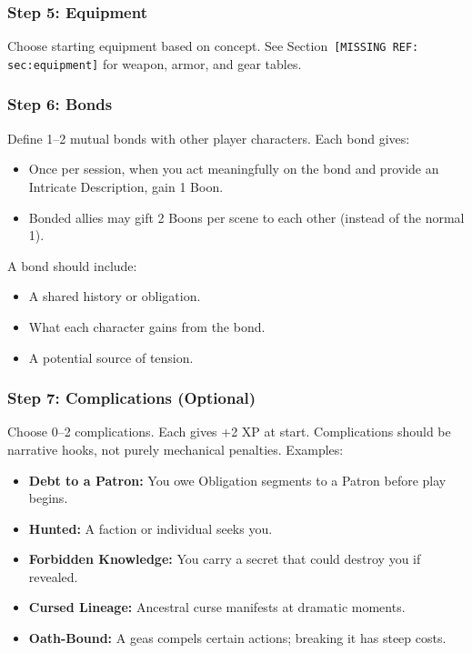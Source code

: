 \subsubsection{Step 5: Equipment}
Choose starting equipment based on concept. See Section~\texttt{[MISSING REF: sec:equipment]} for weapon, armor, and gear tables.

\subsubsection{Step 6: Bonds}
Define 1--2 mutual bonds with other player characters. Each bond gives:

\begin{itemize}
  \item Once per session, when you act meaningfully on the bond and provide an Intricate Description, gain 1 Boon.
  \item Bonded allies may gift 2 Boons per scene to each other (instead of the normal 1).
\end{itemize}

A bond should include:
\begin{itemize}
  \item A shared history or obligation.
  \item What each character gains from the bond.
  \item A potential source of tension.
\end{itemize}

\subsubsection{Step 7: Complications (Optional)}
Choose 0--2 complications. Each gives +2 XP at start. Complications should be narrative hooks, not purely mechanical penalties. Examples:

\begin{itemize}
  \item \textbf{Debt to a Patron:} You owe Obligation segments to a Patron before play begins.
  \item \textbf{Hunted:} A faction or individual seeks you.
  \item \textbf{Forbidden Knowledge:} You carry a secret that could destroy you if revealed.
  \item \textbf{Cursed Lineage:} Ancestral curse manifests at dramatic moments.
  \item \textbf{Oath-Bound:} A geas compels certain actions; breaking it has steep costs.
\end{itemize}

